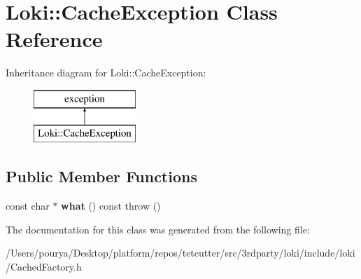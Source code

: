 \hypertarget{classLoki_1_1CacheException}{}\section{Loki\+:\+:Cache\+Exception Class Reference}
\label{classLoki_1_1CacheException}
Inheritance diagram for Loki\+:\+:Cache\+Exception\+:\begin{figure}[H]
\begin{center}
\leavevmode
\includegraphics[height=2.000000cm]{classLoki_1_1CacheException}
\end{center}
\end{figure}
\subsection*{Public Member Functions}
\begin{DoxyCompactItemize}
\item 
\hypertarget{classLoki_1_1CacheException_ac5be12df51fbcb71995bd1857f0935fe}{}const char $\ast$ {\bfseries what} () const   throw ()\label{classLoki_1_1CacheException_ac5be12df51fbcb71995bd1857f0935fe}

\end{DoxyCompactItemize}


The documentation for this class was generated from the following file\+:\begin{DoxyCompactItemize}
\item 
/\+Users/pourya/\+Desktop/platform/repos/tetcutter/src/3rdparty/loki/include/loki/Cached\+Factory.\+h\end{DoxyCompactItemize}
